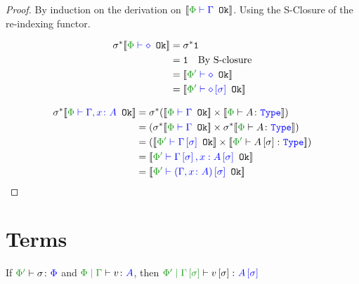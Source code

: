 \documentclass{report}
\begin{document}
\begin{framed}
    \begin{proof}
        By induction on the derivation on $\deno{\wellformedok{\P}{\G}}$. Using the S-Closure of the re-indexing functor.
        
        \begin{align*}
            \si\star\deno{\wellformedok{\P}{\nil}} &=\si\star\1\\
            & = \1\qt{By S-closure}\\
            &= \deno{\wellformedok{\P'}{\nil}}\\
            &= \deno{\wellformedok{\P'}{\nil\ssi}}\\
        \end{align*}
        
        \begin{align*}
           \si\star\deno{\wellformedok{\P}{\gax}} &= \si\star(\deno{\wellformedok{\P}{\G}} \times \deno{\typerelation{\P}{A}{\type}}) \\
           & = (\si\star\deno{\wellformedok{\P}{\G}} \times \si\star\deno{\typerelation{\P}{A}{\type}})\\
            & = (\deno{\wellformedok{\P'}{\G\ssi}} \times \deno{\typerelation{\P'}{A\ssi}{\type}})\\
            & = \deno{\wellformedok{\P'}{\G\ssi, x: A\ssi}}\\
            & = \deno{\wellformedok{\P'}{(\gax)\ssi}}\\
        \end{align*}
    \end{proof}
\end{framed}



\section{Terms}
\begin{theorem}
    If $\typerelation{\P'}{\si}{\P}$ and $\gpetyperelation{v}{A}$, then $\etyperelation{\P'}{\G\ssi}{v\ssi}{A\ssi}$ 
\end{theorem}
\end{document}
